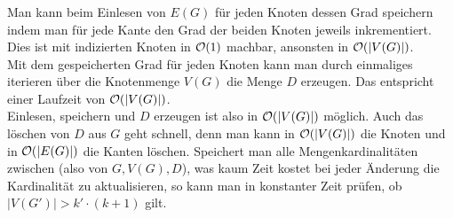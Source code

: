 \documentclass[a4paper]{article}
\begin{document}
		\subsubsection{}
			Man kann beim Einlesen von $E(G)$ für jeden Knoten dessen Grad speichern indem man für jede Kante den Grad der beiden Knoten jeweils inkrementiert.
			Dies ist mit indizierten Knoten in $\mathcal{O}(1)$ machbar, ansonsten in $\mathcal{O}(|V(G)|)$.\\
			Mit dem gespeicherten Grad für jeden Knoten kann man durch einmaliges iterieren über die Knotenmenge $V(G)$ die Menge $D$ erzeugen. Das entspricht einer Laufzeit von $\mathcal{O}(|V(G)|)$.\\
			Einlesen, speichern und $D$ erzeugen ist also in $\mathcal{O}(|V(G)|)$ möglich.\n
			Auch das löschen von $D$ aus $G$ geht schnell, denn man kann in $\mathcal{O}(|V(G)|)$ die Knoten und in $\mathcal{O}(|E(G)|)$ die Kanten löschen.
			Speichert man alle Mengenkardinalitäten zwischen (also von $G, V(G), D$), was kaum Zeit kostet bei jeder Änderung die Kardinalität zu aktualisieren, so kann man in konstanter Zeit prüfen, ob $|V(G')|>k'\cdot(k+1)$ gilt.
\end{document}
